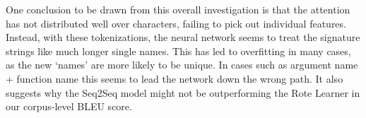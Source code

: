\begin{table}
\centering
{}
    \caption{Three translations and attentions for an example of some the attentions of from the Name + Other Arguments on the tokenization on a Seq-to-Seq model trained on the Full Random-Split Dataset. Here is shows that, on the Full Random-Split Dataset, the most important feature is variable name, and the model attends solely to that, but that the hidden state of the LSTM still takes into account characters after the variable input }
    \label{fig:otherarg_attn_full_dataset}
\end{table}

One conclusion to be drawn from this overall investigation is that the attention has not distributed well over characters, failing to pick out individual features. Instead, with these tokenizations, the neural network seems to treat the signature strings like much longer single names. 
This has led to overfitting in many cases, as the new `names' are more likely to be unique. In cases such as argument name + function name this seems to lead the network down the wrong path. It also suggests why the Seq2Seq model might not be outperforming  the Rote Learner in our corpus-level BLEU score. 

